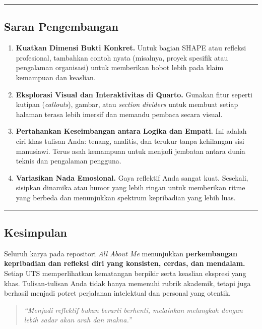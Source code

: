 \documentclass[
  letterpaper,
  DIV=11,
  numbers=noendperiod]{scrreprt}
\begin{document}
\begin{center}\rule{0.5\linewidth}{0.5pt}\end{center}

\subsection{Saran Pengembangan}\label{saran-pengembangan}

\begin{enumerate}
\def\labelenumi{\arabic{enumi}.}
\item
  \textbf{Kuatkan Dimensi Bukti Konkret.} Untuk bagian SHAPE atau
  refleksi profesional, tambahkan contoh nyata (misalnya, proyek
  spesifik atau pengalaman organisasi) untuk memberikan bobot lebih pada
  klaim kemampuan dan keaslian.
\item
  \textbf{Eksplorasi Visual dan Interaktivitas di Quarto.} Gunakan fitur
  seperti kutipan (\emph{callouts}), gambar, atau \emph{section
  dividers} untuk membuat setiap halaman terasa lebih imersif dan
  memandu pembaca secara visual.
\item
  \textbf{Pertahankan Keseimbangan antara Logika dan Empati.} Ini adalah
  ciri khas tulisan Anda: tenang, analitis, dan terukur tanpa kehilangan
  sisi manusiawi. Terus asah kemampuan untuk menjadi jembatan antara
  dunia teknis dan pengalaman pengguna.
\item
  \textbf{Variasikan Nada Emosional.} Gaya reflektif Anda sangat kuat.
  Sesekali, sisipkan dinamika atau humor yang lebih ringan untuk
  memberikan ritme yang berbeda dan menunjukkan spektrum kepribadian
  yang lebih luas.
\end{enumerate}

\begin{center}\rule{0.5\linewidth}{0.5pt}\end{center}

\subsection{Kesimpulan}\label{kesimpulan}

Seluruh karya pada repositori \emph{All About Me} menunjukkan
\textbf{perkembangan kepribadian dan refleksi diri yang konsisten,
cerdas, dan mendalam.} Setiap UTS memperlihatkan kematangan berpikir
serta keaslian ekspresi yang khas. Tulisan-tulisan Anda tidak hanya
memenuhi rubrik akademik, tetapi juga berhasil menjadi potret perjalanan
intelektual dan personal yang otentik.

\begin{quote}
\emph{``Menjadi reflektif bukan berarti berhenti, melainkan melangkah
dengan lebih sadar akan arah dan makna.''}
\end{quote}
\end{document}
